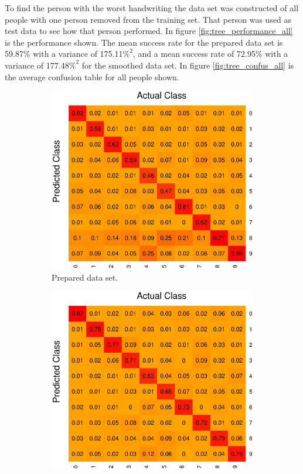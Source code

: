 To find the person with the worst handwriting the data set was constructed of all people with one person removed from the training set.
That person was used as test data to see how that person performed.
In figure \ref{fig:tree_performance_all} is the performance shown.
The mean success rate for the prepared data set is 59.87\% with a variance of 175.11\(\%^2\), 
and a mean success rate of 72.95\% with a variance of 177.48\(\%^2\) for the smoothed data set.
In figure \ref{fig:tree_confus_all} is the average confusion table for all people shown.



\begin{figure}[H]
\centering
\begin{subfigure}{0.49\textwidth}
\includegraphics[width=\textwidth]{graphics/tree_confusion_all}
\caption{Prepared data set.}
\end{subfigure}
\begin{subfigure}{0.49\textwidth}
\includegraphics[width=\textwidth]{graphics/tree_confusion_all2}

\end{subfigure}
\end{figure}
